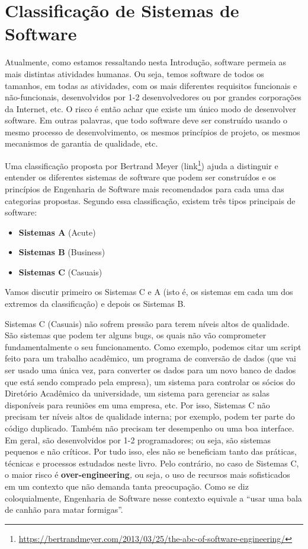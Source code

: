 \documentclass[
  11pt,
  twoside]{book}
\DeclareRobustCommand{\href}[2]{#2\footnote{\url{#1}}}
\begin{document}
\hypertarget{classificauxe7uxe3o-de-sistemas-de-software}{%
\section{Classificação de Sistemas de
Software}\label{classificauxe7uxe3o-de-sistemas-de-software}}

 Atualmente, como estamos ressaltando nesta
Introdução, software permeia as mais distintas atividades humanas. Ou
seja, temos software de todos os tamanhos, em todas as atividades, com
os mais diferentes requisitos funcionais e não-funcionais, desenvolvidos
por 1-2 desenvolvedores ou por grandes corporações da Internet, etc. O
risco é então achar que existe um único modo de desenvolver software. Em
outras palavras, que todo software deve ser construído usando o mesmo
processo de desenvolvimento, os mesmos princípios de projeto, os mesmos
mecanismos de garantia de qualidade, etc.

 Uma classificação proposta por Bertrand Meyer
(\href{https://bertrandmeyer.com/2013/03/25/the-abc-of-software-engineering/}{link})
ajuda a distinguir e entender os diferentes sistemas de software que
podem ser construídos e os princípios de Engenharia de Software mais
recomendados para cada uma das categorias propostas. Segundo essa
classificação, existem três tipos principais de software:

\begin{itemize}
\item
  \textbf{Sistemas A} (Acute)
\item
  \textbf{Sistemas B} (Business)
\item
  \textbf{Sistemas C} (Casuais)
\end{itemize}

Vamos discutir primeiro os Sistemas C e A (isto é, os sistemas em cada
um dos extremos da classificação) e depois os Sistemas B.

  Sistemas C (Casuais)
não sofrem pressão para terem níveis altos de qualidade. São sistemas
que podem ter alguns bugs, os quais não vão comprometer fundamentalmente
o seu funcionamento. Como exemplo, podemos citar um script feito para um
trabalho acadêmico, um programa de conversão de dados (que vai ser usado
uma única vez, para converter os dados para um novo banco de dados que
está sendo comprado pela empresa), um sistema para controlar os sócios
do Diretório Acadêmico da universidade, um sistema para gerenciar as
salas disponíveis para reuniões em uma empresa, etc. Por isso, Sistemas
C não precisam ter níveis altos de qualidade interna; por exemplo, podem
ter parte do código duplicado. Também não precisam ter desempenho ou uma
boa interface. Em geral, são desenvolvidos por 1-2 programadores; ou
seja, são sistemas pequenos e não críticos. Por tudo isso, eles não se
beneficiam tanto das práticas, técnicas e processos estudados neste
livro. Pelo contrário, no caso de Sistemas C, o maior risco é
\textbf{over-engineering}\emph{,} ou seja\emph{,} o uso de recursos mais
sofisticados em um contexto que não demanda tanta preocupação. Como se
diz coloquialmente, Engenharia de Software nesse contexto equivale a
``usar uma bala de canhão para matar formigas''.
\end{document}
